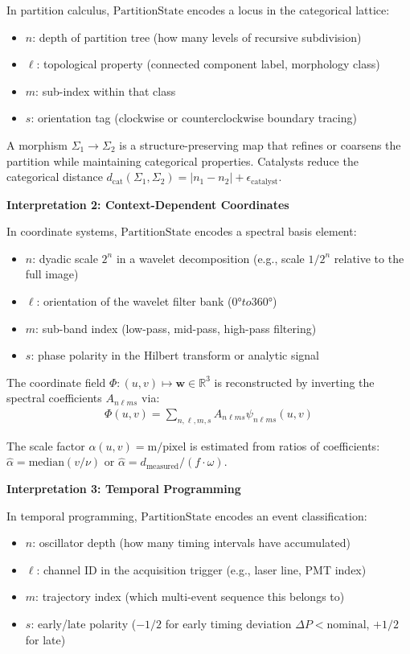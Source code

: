 \documentclass[11pt,twocolumn]{article}
\begin{document}
In partition calculus, $\text{PartitionState}$ encodes a locus in the categorical lattice:
\begin{itemize}
\item $n$: depth of partition tree (how many levels of recursive subdivision)
\item $\ell$: topological property (connected component label, morphology class)
\item $m$: sub-index within that class
\item $s$: orientation tag (clockwise or counterclockwise boundary tracing)
\end{itemize}

A morphism $\Sigma_1 \to \Sigma_2$ is a structure-preserving map that refines or coarsens the partition while maintaining categorical properties. Catalysts reduce the categorical distance $d_{\text{cat}}(\Sigma_1, \Sigma_2) = |n_1 - n_2| + \epsilon_{\text{catalyst}}$.

\textbf{Interpretation 2: Context-Dependent Coordinates}

In coordinate systems, $\text{PartitionState}$ encodes a spectral basis element:
\begin{itemize}
\item $n$: dyadic scale $2^n$ in a wavelet decomposition (e.g., scale $1/2^n$ relative to the full image)
\item $\ell$: orientation of the wavelet filter bank ($0° to 360°$)
\item $m$: sub-band index (low-pass, mid-pass, high-pass filtering)
\item $s$: phase polarity in the Hilbert transform or analytic signal
\end{itemize}

The coordinate field $\Phi : (u, v) \mapsto \mathbf{w} \in \mathbb{R}^3$ is reconstructed by inverting the spectral coefficients $A_{n\ell m s}$ via:
\begin{align}
\Phi(u, v) = \sum_{n, \ell, m, s} A_{n\ell m s} \psi_{n\ell m s}(u, v)
\end{align}

The scale factor $\alpha(u, v) = \text{m/pixel}$ is estimated from ratios of coefficients: $\hat{\alpha} = \text{median}(v / \nu)$ or $\hat{\alpha} = d_{\text{measured}} / (f \cdot \omega)$.

\textbf{Interpretation 3: Temporal Programming}

In temporal programming, $\text{PartitionState}$ encodes an event classification:
\begin{itemize}
\item $n$: oscillator depth (how many timing intervals have accumulated)
\item $\ell$: channel ID in the acquisition trigger (e.g., laser line, PMT index)
\item $m$: trajectory index (which multi-event sequence this belongs to)
\item $s$: early/late polarity ($-1/2$ for early timing deviation $\Delta P < \text{nominal}$, $+1/2$ for late)
\end{itemize}
\end{document}
